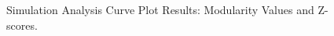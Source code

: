  \begin{figure}[!ht]
	\begin{center}
		\caption{Simulation Analysis Curve Plot Results: Modularity Values and Z-scores.}
		\label{figure-FBA-results}
	\end{center}
\end{figure}